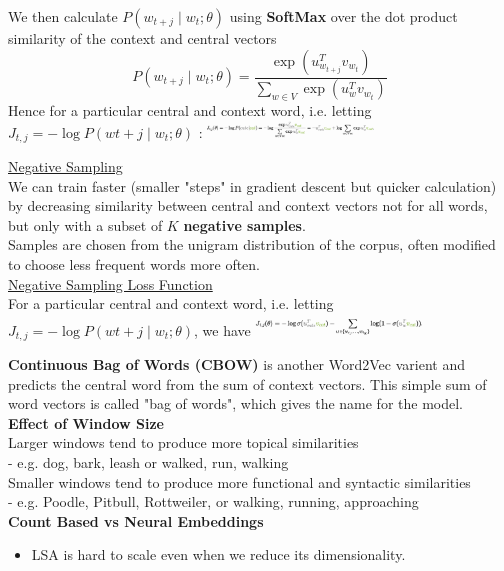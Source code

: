 \documentclass[8pt]{extarticle} %
\begin{document}
\begin{multicols*}{3}
We then calculate $P(w_{t+j}\mid w_t;\theta)$ using \textbf{SoftMax} over the dot product similarity of the context and central vectors
$$P(w_{t+j}\mid w_t;\theta)=\frac{\exp(u_{w_{t+j}}^T v_{w_t})}{\sum_{w \in V}\exp(u_w^T v_{w_t})}$$
Hence for a particular central and context word, i.e. letting $J_{t,j} = -\log P(w{t+j}\mid w_t;\theta)$ :
\includegraphics[width=0.33\textwidth]{media/loss-word-context.png}

\underline{Negative Sampling}\\
We can train faster (smaller "steps" in gradient descent but quicker calculation) by decreasing similarity between central 
and context vectors not for all words, but only with a subset of $K$ \textbf{negative samples}.\\

Samples are chosen from the unigram distribution of the corpus, often modified to choose less frequent words more often. \\

\underline{Negative Sampling Loss Function}\\
For a particular central and context word, i.e. letting $J_{t,j} = -\log P(w{t+j}\mid w_t;\theta)$, we have
\includegraphics[width=0.33\textwidth]{media/negative-sampling-loss.png}

\textbf{Continuous Bag of Words (CBOW)} is another Word2Vec varient and predicts the central word from the sum of context vectors. This simple sum of word vectors is called "bag of words", which gives the name for the model.\\

\textbf{Effect of Window Size}\\
Larger windows tend to produce more topical similarities \\
- e.g. dog, bark, leash or walked, run, walking\\
Smaller windows tend to produce more functional and syntactic similarities \\
- e.g. Poodle, Pitbull, Rottweiler, or walking, running, approaching\\

\textbf{Count Based vs Neural Embeddings}\\
\begin{itemize}[label=\textbullet, labelsep=0.3em, leftmargin=0.5em, itemsep=0em]
    \item LSA is hard to scale even when we reduce its dimensionality.
\end{itemize}


\end{multicols*}
\end{document}
